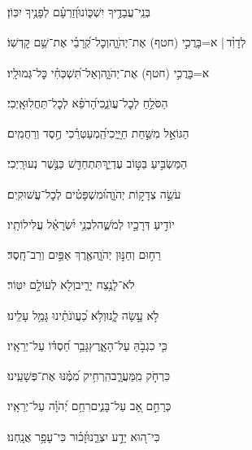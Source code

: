 \documentclass[12pt]{article}
\newcommand{\loc}[1]{\textsuperscript{\locf{#1}}}
\begin{document}
{\loc{ כט}~}‏בְּנֵֽי־עֲבָדֶ֥יךָ יִשְׁכּ֑וֹנוּ{\hfill}וְ֝זַרְעָ֗ם לְפָנֶ֥יךָ יִכּֽוֹן׃\par\pend
\ledpb
\pstart[\subsection*{\textcolor{red}{פרק קג}}]\label{פרק קג}
{\loc{ א}~}‏לְדָוִ֨ד |  א=בָּרֲכִ֣י (חטף)  אֶת־יְהֹוָ֑ה{\hfill}וְכׇל־קְ֝רָבַ֗י אֶת־שֵׁ֥ם קׇדְשֽׁוֹ׃\par

{\loc{ ב}~}‏א=בָּרֲכִ֣י (חטף)  אֶת־יְהֹוָ֑ה{\hfill}וְאַל־תִּ֝שְׁכְּחִ֗י כׇּל־גְּמוּלָֽיו׃\par

{\loc{ ג}~}‏הַסֹּלֵ֥חַ לְכׇל־עֲוֺנֵ֑כִי{\hfill}הָ֝רֹפֵ֗א לְכׇל־תַּחֲלוּאָֽיְכִי׃\par

{\loc{ ד}~}‏הַגּוֹאֵ֣ל מִשַּׁ֣חַת חַיָּ֑יְכִי{\hfill}הַֽ֝מְעַטְּרֵ֗כִי חֶ֣סֶד וְרַחֲמִֽים׃\par

{\loc{ ה}~}‏הַמַּשְׂבִּ֣יעַ בַּטּ֣וֹב עֶדְיֵ֑ךְ{\hfill}תִּתְחַדֵּ֖שׁ כַּנֶּ֣שֶׁר נְעוּרָֽיְכִי׃\par

{\loc{ ו}~}‏עֹשֵׂ֣ה צְדָק֣וֹת יְהֹוָ֑ה{\hfill}וּ֝מִשְׁפָּטִ֗ים לְכׇל־עֲשׁוּקִֽים׃\par

{\loc{ ז}~}‏יוֹדִ֣יעַ דְּרָכָ֣יו לְמֹשֶׁ֑ה{\hfill}לִבְנֵ֥י יִ֝שְׂרָאֵ֗ל עֲלִילוֹתָֽיו׃\par

{\loc{ ח}~}‏רַח֣וּם וְחַנּ֣וּן יְהֹוָ֑ה{\hfill}אֶ֖רֶךְ אַפַּ֣יִם וְרַב־חָֽסֶד׃\par

{\loc{ ט}~}‏לֹא־לָנֶ֥צַח יָרִ֑יב{\hfill}וְלֹ֖א לְעוֹלָ֣ם יִטּֽוֹר׃\par

{\loc{ י}~}‏לֹ֣א  עָ֣שָׂה לָ֑נוּ{\hfill}וְלֹ֥א כַ֝עֲוֺנֹתֵ֗ינוּ גָּמַ֥ל עָלֵֽינוּ׃\par

{\loc{ יא}~}‏כִּ֤י כִגְבֹ֣הַּ  עַל־הָאָ֑רֶץ{\hfill}גָּבַ֥ר חַ֝סְדּ֗וֹ עַל־יְרֵאָֽיו׃\par

{\loc{ יב}~}‏כִּרְחֹ֣ק  מִֽמַּעֲרָ֑ב{\hfill}הִֽרְחִ֥יק מִ֝מֶּ֗נּוּ אֶת־פְּשָׁעֵֽינוּ׃\par

{\loc{ יג}~}‏כְּרַחֵ֣ם אָ֭ב עַל־בָּנִ֑ים{\hfill}רִחַ֥ם יְ֝הֹוָ֗ה עַל־יְרֵאָֽיו׃\par

{\loc{ יד}~}‏כִּי־ה֭וּא יָדַ֣ע יִצְרֵ֑נוּ{\hfill}זָ֝כ֗וּר כִּי־עָפָ֥ר אֲנָֽחְנוּ׃\par
\end{document}
